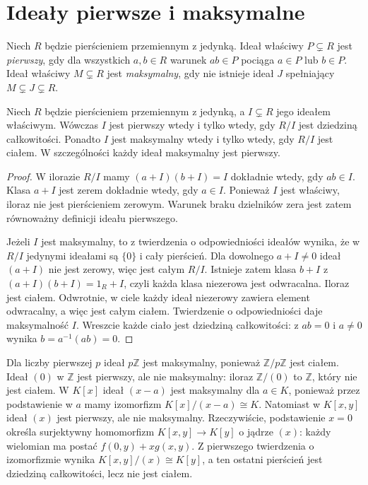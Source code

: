 \section{Ideały pierwsze i maksymalne}
\begin{definicja}
\label{aa:def:prime-max-ideal}
Niech $R$ będzie pierścieniem przemiennym z jedynką.
Ideał właściwy $P\subsetneq R$ jest \emph{pierwszy}, gdy
dla wszystkich $a,b\in R$ warunek $ab\in P$ pociąga
$a\in P$ lub $b\in P$.
Ideał właściwy $M\subsetneq R$ jest \emph{maksymalny}, gdy
nie istnieje ideał $J$ spełniający
$M\subsetneq J\subsetneq R$.
\end{definicja}
\begin{twierdzenie}
\label{aa:tw:prime-max-quotient}
Niech $R$ będzie pierścieniem przemiennym z jedynką,
a $I\subsetneq R$ jego ideałem właściwym.
Wówczas $I$ jest pierwszy wtedy i tylko wtedy, gdy
$R/I$ jest dziedziną całkowitości. Ponadto $I$ jest
maksymalny wtedy i tylko wtedy, gdy $R/I$ jest ciałem.
W szczególności każdy ideał maksymalny jest pierwszy.
\end{twierdzenie}
\begin{proof}
W ilorazie $R/I$ mamy $(a+I)(b+I)=I$ dokładnie wtedy,
gdy $ab\in I$. Klasa $a+I$ jest zerem dokładnie wtedy,
gdy $a\in I$. Ponieważ $I$ jest właściwy, iloraz nie jest
pierścieniem zerowym. Warunek braku dzielników zera jest
zatem równoważny definicji ideału pierwszego.

Jeżeli $I$ jest maksymalny, to z twierdzenia o odpowiedniości
ideałów wynika, że w $R/I$ jedynymi ideałami są $\{0\}$
i cały pierścień. Dla dowolnego $a+I\ne0$ ideał
$(a+I)$ nie jest zerowy, więc jest całym $R/I$.
Istnieje zatem klasa $b+I$ z $(a+I)(b+I)=1_R+I$,
czyli każda klasa niezerowa jest odwracalna. Iloraz jest ciałem.
Odwrotnie, w ciele każdy ideał niezerowy zawiera element
odwracalny, a więc jest całym ciałem. Twierdzenie
o odpowiedniości daje maksymalność $I$.
Wreszcie każde ciało jest dziedziną całkowitości:
z $ab=0$ i $a\ne0$ wynika $b=a^{-1}(ab)=0$.
\end{proof}

\begin{przyklad}
\label{aa:prz:prime-max-examples}
Dla liczby pierwszej $p$ ideał $p\mathbb Z$ jest
maksymalny, ponieważ $\mathbb Z/p\mathbb Z$ jest ciałem.
Ideał $(0)$ w $\mathbb Z$ jest pierwszy, ale nie maksymalny:
iloraz $\mathbb Z/(0)$ to $\mathbb Z$, który nie jest ciałem.
W $K[x]$ ideał $(x-a)$ jest maksymalny dla $a\in K$,
ponieważ przez podstawienie w $a$ mamy izomorfizm
$K[x]/(x-a)\cong K$. Natomiast w $K[x,y]$ ideał $(x)$ jest pierwszy,
ale nie maksymalny. Rzeczywiście, podstawienie $x=0$
określa surjektywny homomorfizm $K[x,y]\to K[y]$ o jądrze
$(x)$: każdy wielomian ma postać $f(0,y)+xg(x,y)$.
Z pierwszego twierdzenia o izomorfizmie wynika
$K[x,y]/(x)\cong K[y]$, a ten ostatni pierścień
jest dziedziną całkowitości, lecz nie jest ciałem.
\end{przyklad}

